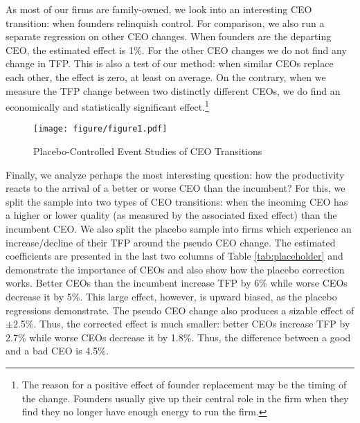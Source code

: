 \documentclass[11pt,a4paper]{article}
\begin{document}
As most of our firms are family-owned, we look into an interesting CEO transition: when founders relinquish control. For comparison, we also run a separate regression on other CEO changes. When founders are the departing CEO, the estimated effect is 1\%. For the other CEO changes we do not find any change in TFP. This is also a test of our method: when similar CEOs replace each other, the effect is zero, at least on average. On the contrary, when we measure the TFP change between two distinctly different CEOs, we do find an economically and statistically significant effect.\footnote{The reason for a positive effect of founder replacement may be the timing of the change. Founders usually give up their central role in the firm when they find they no longer have enough energy to run the firm.} 

\begin{figure}[htbp]
\centering
\texttt{[image: figure/figure1.pdf]}
\caption{Placebo-Controlled Event Studies of CEO Transitions}
\label{fig:event_study_main}
\end{figure}

Finally, we analyze perhaps the most interesting question: how the productivity reacts to the arrival of a better or worse CEO than the incumbent? For this, we split the sample into two types of CEO transitions: when the incoming CEO has a higher or lower quality (as measured by the associated fixed effect) than the incumbent CEO. We also split the placebo sample into firms which experience an increase/decline of their TFP around the pseudo CEO change. The estimated coefficients are presented in the last two columns of Table \ref{tab:placeholder} and demonstrate the importance of CEOs and also show how the placebo correction works. Better CEOs than the incumbent increase TFP by 6\% while worse CEOs decrease it by 5\%. This large effect, however, is upward biased, as the placebo regressions demonstrate. The pseudo CEO change also produces a sizable effect of $\pm$2.5\%. Thus, the corrected effect is much smaller: better CEOs increase TFP by 2.7\% while worse CEOs decrease it by 1.8\%. Thus, the difference between a good and a bad CEO is 4.5\%. 
\end{document}

